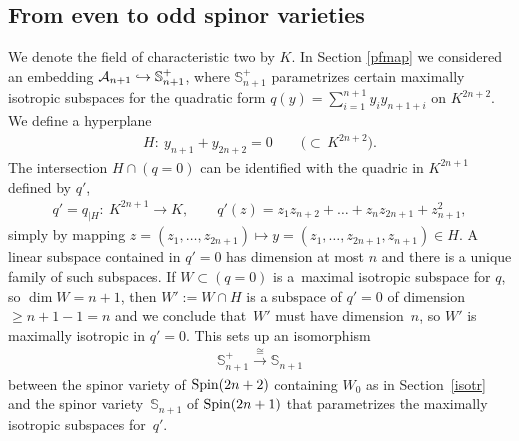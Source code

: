 \documentclass[pdftex]{sigma}
\newcommand{\bS}{{\mathbb S}}
\newcommand{\cA}{{\cal A}}
\numberwithin{equation}{section}
\begin{document}
\subsection{From even to odd spinor varieties}\label{evenodd}
We denote the field of characteristic two by $K$. In Section \ref{pfmap} we considered an embedding $\cA_{n+1}\hookrightarrow\bS_{n+1}^+$, where $\bS_{n+1}^+$ parametrizes certain maximally isotropic subspaces for the quadratic form $q(y)=\sum\limits_{i=1}^{n+1}y_iy_{n+1+i}$ on $K^{2n+2}$. We define a hyperplane
\begin{gather*}
H\colon \ y_{n+1} + y_{2n+2} = 0 \qquad \big({\subset}\, K^{2n+2}\big).
\end{gather*}
The intersection $H\cap (q=0)$ can be identified with
the quadric in $K^{2n+1}$ defined by $q'$,
\begin{gather*}
q'=q_{|H}\colon \ K^{2n+1} \longrightarrow K,\qquad q'(z) = z_1z_{n+2} +\dots+ z_nz_{2n+1} + z_{n+1}^2,
\end{gather*}
simply by mapping $z=(z_1,\ldots,z_{2n+1})\mapsto y=(z_1,\ldots,z_{2n+1},z_{n+1})\in H$. A linear subspace contained in $q'=0$ has dimension at most $n$ and there is a unique family of such subspaces. If $W\subset (q=0)$ is a~maximal isotropic subspace for $q$, so $\dim W=n+1$, then $W':=W\cap H$ is a subspace of $q'=0$ of dimension $\geq n+1-1=n$ and we conclude that~$W'$ must have dimension~$n$, so $W'$ is maximally isotropic in $q'=0$. This sets up an isomorphism
\begin{gather*}
\bS_{n+1}^+ \stackrel{\cong}{\longrightarrow} \bS_{n+1}
\end{gather*}
between the spinor variety of ${\rm Spin}(2n+2)$ containing $W_0$ as in Section~\ref{isotr} and the spinor variety~$\bS_{n+1}$ of ${\rm Spin}(2n+1)$ that parametrizes the maximally isotropic subspaces for~$q'$.
\end{document}
